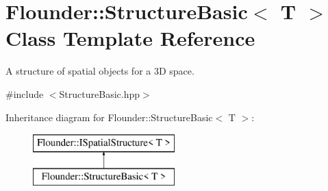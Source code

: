 \hypertarget{class_flounder_1_1_structure_basic}{}\section{Flounder\+:\+:Structure\+Basic$<$ T $>$ Class Template Reference}
\label{class_flounder_1_1_structure_basic}


A structure of spatial objects for a 3D space.  




{\ttfamily \#include $<$Structure\+Basic.\+hpp$>$}

Inheritance diagram for Flounder\+:\+:Structure\+Basic$<$ T $>$\+:\begin{figure}[H]
\begin{center}
\leavevmode
\includegraphics[height=2.000000cm]{class_flounder_1_1_structure_basic}
\end{center}
\end{figure}
